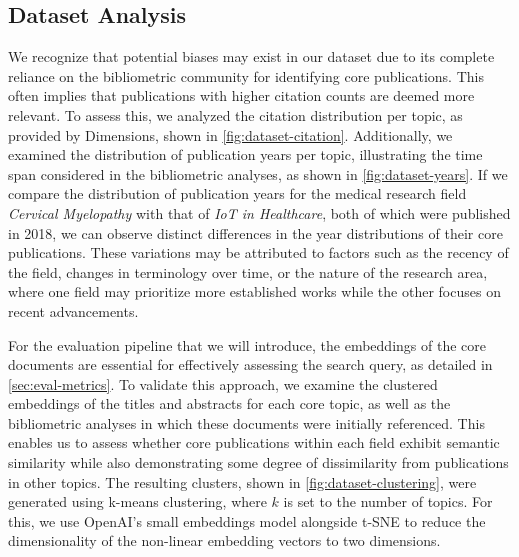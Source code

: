 \subsection{Dataset Analysis}
We recognize that potential biases may exist in our dataset due to its complete reliance on the bibliometric community for identifying core publications. This often implies that publications with higher citation counts are deemed more relevant. To assess this, we analyzed the citation distribution per topic, as provided by Dimensions, shown in \autoref{fig:dataset-citation}. Additionally, we examined the distribution of publication years per topic, illustrating the time span considered in the bibliometric analyses, as shown in \autoref{fig:dataset-years}.  If we compare the distribution of publication years for the medical research field \textit{Cervical Myelopathy} with that of \textit{IoT in Healthcare}, both of which were published in 2018, we can observe distinct differences in the year distributions of their core publications. These variations may be attributed to factors such as the recency of the field, changes in terminology over time, or the nature of the research area, where one field may prioritize more established works while the other focuses on recent advancements.

For the evaluation pipeline that we will introduce, the embeddings of the core documents are essential for effectively assessing the search query, as detailed in \autoref{sec:eval-metrics}. To validate this approach, we examine the clustered embeddings of the titles and abstracts for each core topic, as well as the bibliometric analyses in which these documents were initially referenced. This enables us to assess whether core publications within each field exhibit semantic similarity while also demonstrating some degree of dissimilarity from publications in other topics. The resulting clusters, shown in \autoref{fig:dataset-clustering}, were generated using k-means clustering, where $k$ is set to the number of topics. For this, we use OpenAI's small embeddings model alongside t-SNE\autocite{van2008visualizing} to reduce the dimensionality of the non-linear embedding vectors to two dimensions.


